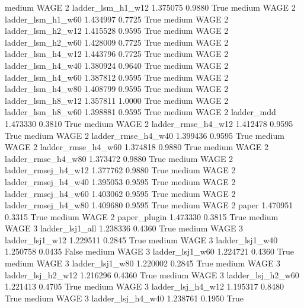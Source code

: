     medium     WAGE                 2   ladder_lsm_h1_w12   1.375075      0.9880    True
    medium     WAGE                 2   ladder_lsm_h1_w60   1.434997      0.7725    True
    medium     WAGE                 2   ladder_lsm_h2_w12   1.415528      0.9595    True
    medium     WAGE                 2   ladder_lsm_h2_w60   1.428009      0.7725    True
    medium     WAGE                 2   ladder_lsm_h4_w12   1.443796      0.7725    True
    medium     WAGE                 2   ladder_lsm_h4_w40   1.380924      0.9640    True
    medium     WAGE                 2   ladder_lsm_h4_w60   1.387812      0.9595    True
    medium     WAGE                 2   ladder_lsm_h4_w80   1.408799      0.9595    True
    medium     WAGE                 2   ladder_lsm_h8_w12   1.357811      1.0000    True
    medium     WAGE                 2   ladder_lsm_h8_w60   1.398881      0.9595    True
    medium     WAGE                 2          ladder_mdd   1.473330      0.3810    True
    medium     WAGE                 2  ladder_rmse_h4_w12   1.412478      0.9595    True
    medium     WAGE                 2  ladder_rmse_h4_w40   1.399436      0.9595    True
    medium     WAGE                 2  ladder_rmse_h4_w60   1.374818      0.9880    True
    medium     WAGE                 2  ladder_rmse_h4_w80   1.373472      0.9880    True
    medium     WAGE                 2 ladder_rmsej_h4_w12   1.377762      0.9880    True
    medium     WAGE                 2 ladder_rmsej_h4_w40   1.395053      0.9595    True
    medium     WAGE                 2 ladder_rmsej_h4_w60   1.403062      0.9595    True
    medium     WAGE                 2 ladder_rmsej_h4_w80   1.409680      0.9595    True
    medium     WAGE                 2               paper   1.470951      0.3315    True
    medium     WAGE                 2        paper_plugin   1.473330      0.3815    True
    medium     WAGE                 3     ladder_lsj1_all   1.238336      0.4360    True
    medium     WAGE                 3     ladder_lsj1_w12   1.229511      0.2845    True
    medium     WAGE                 3     ladder_lsj1_w40   1.250758      0.0435   False
    medium     WAGE                 3     ladder_lsj1_w60   1.224721      0.4360    True
    medium     WAGE                 3     ladder_lsj1_w80   1.220002      0.2845    True
    medium     WAGE                 3   ladder_lsj_h2_w12   1.216296      0.4360    True
    medium     WAGE                 3   ladder_lsj_h2_w60   1.221413      0.4705    True
    medium     WAGE                 3   ladder_lsj_h4_w12   1.195317      0.8480    True
    medium     WAGE                 3   ladder_lsj_h4_w40   1.238761      0.1950    True
